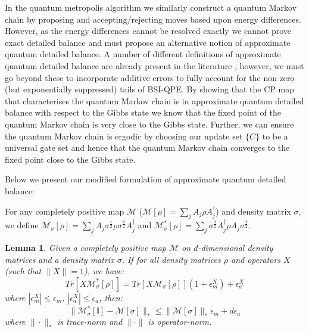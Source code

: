 \documentclass[aps,floatfix,10pt,amssymb,amsfont,amsmath,superscriptaddress,float,nofootinbib,longbibliography,nobalancelastpage,twocolumn]{revtex4-2}
\newtheorem{lemma}{Lemma}
\begin{document}
In the quantum metropolis algorithm we similarly construct a quantum Markov chain by proposing and accepting/rejecting moves based upon energy differences. However, as the energy differences cannot be resolved exactly we cannot prove exact detailed balance and must propose an alternative notion of approximate quantum detailed balance. A number of different definitions of approximate quantum detailed balance are already present in the literature \cite{}, however, we must go beyond these to incorporate additive errors to fully account for the non-zero (but exponentially suppressed) tails of BSI-QPE. By showing that the CP map that characterises the quantum Markov chain is in approximate quantum detailed balance with respect to the Gibbs state we know that the fixed point of the quantum Markov chain is very close to the Gibbs state. Further, we can ensure the quantum Markov chain is ergodic by choosing our update set $\{C\}$ to be a universal gate set \cite{Temme_2011} and hence that the quantum Markov chain converges to the fixed point close to the Gibbs state.

Below we present our modified formulation of approximate quantum detailed balance:

For any completely positive map $\mathcal{M}$ ($\mathcal{M}[\rho] =\sum_{j}  A_{j}\rho  A^{\dagger}_{j}$) and density matrix $\sigma$, we define $\mathcal{M}_{\sigma}[\rho] =\sum_{j}  A_{j}\sigma^{\frac{1}{2}}\rho\sigma^{\frac{1}{2}}  A^{\dagger}_{j}$ and $ \mathcal{M}^*_{\sigma}[\rho] = \sum_{j} \sigma^{\frac{1}{2}}A^{\dagger}_{j}\rho A_{j}\sigma^{\frac{1}{2}}$.
\begin{lemma}
\label{lemma:1}
Given a completely positive map $\mathcal{M}$ on $d$-dimensional density matrices and a density matrix $\sigma$.  If for all density matrices $\rho$ and operators $X$ (such that $\|X\|=1$), we have:
\begin{equation}
    Tr\left[X \mathcal{M}^*_{\sigma}[\rho]\right] = Tr\left[X\mathcal{M}_{\sigma}[\rho]\right](1+\epsilon^{X}_m) + \epsilon^{X}_a
    \label{eq:approximate_quantum_detailed_balance_condition}
\end{equation}
where $|\epsilon^{X}_m| \leq \epsilon_m$, $|\epsilon^{X}_a| \leq \epsilon_a$, then:
 \begin{equation}
    \|\mathcal{M}^*_{\sigma}[\mathbb{I}]-\mathcal{M}[\sigma] \|_* \leq \|\mathcal{M}[\sigma]\|_*\epsilon_m + d\epsilon_a
\end{equation}
where $\|\cdot\|_*$ is trace-norm and $\|\cdot\|$ is operator-norm.
\end{lemma}
\end{document}
